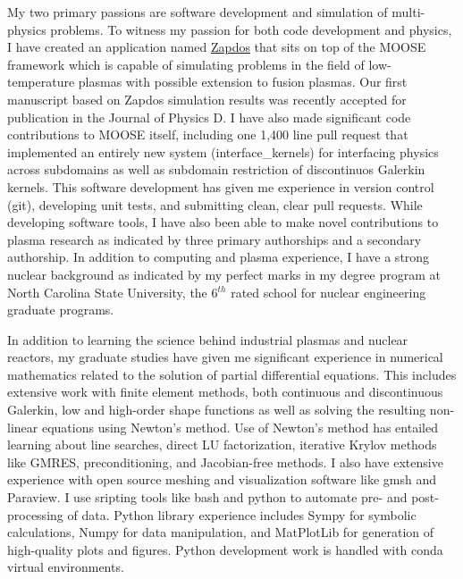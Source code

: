 My two primary passions are software development and simulation of multi-physics problems. To witness my passion for both code development and physics, I have created an application named \href{https://github.com/lindsayad/zapdos}{Zapdos} that sits on top of the MOOSE framework which is capable of simulating problems in the field of low-temperature plasmas with possible extension to fusion plasmas. Our first manuscript based on Zapdos simulation results was recently accepted for publication in the Journal of Physics D. I have also made significant code contributions to MOOSE itself, including one 1,400 line pull request that implemented an entirely new system (interface\_kernels) for interfacing physics across subdomains as well as subdomain restriction of discontinuos Galerkin kernels. This software development has given me experience in version control (git), developing unit tests, and submitting clean, clear pull requests. While developing software tools, I have also been able to make novel contributions to plasma research as indicated by three primary authorships and a secondary authorship. In addition to computing and plasma experience, I have a strong nuclear background as indicated by my perfect marks in my degree program at North Carolina State University, the 6$^{th}$ rated school for nuclear engineering graduate programs.

In addition to learning the science behind industrial plasmas and nuclear reactors, my graduate studies have given me significant experience in numerical mathematics related to the solution of partial differential equations. This includes extensive work with finite element methods, both continuous and discontinuous Galerkin, low and high-order shape functions as well as solving the resulting non-linear equations using Newton's method. Use of Newton's method has entailed learning about line searches, direct LU factorization, iterative Krylov methods like GMRES, preconditioning, and Jacobian-free methods. I also have extensive experience with open source meshing and visualization software like gmsh and Paraview. I use sripting tools like bash and python to automate pre- and post-processing of data. Python library experience includes Sympy for symbolic calculations, Numpy for data manipulation, and MatPlotLib for generation of high-quality plots and figures. Python development work is handled with conda virtual environments.

